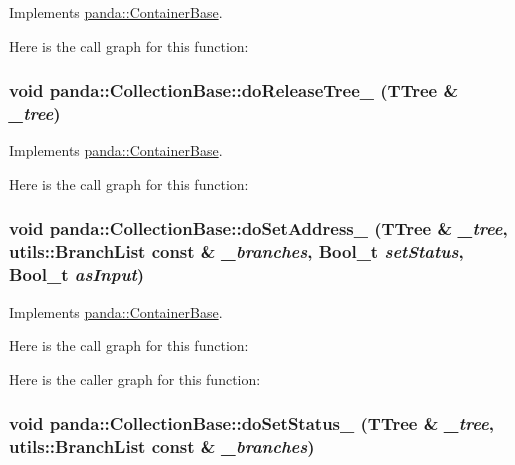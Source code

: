 Implements \hyperlink{classpanda_1_1ContainerBase_a6aa05603a5aff914a56681ab70b01b4e}{panda::ContainerBase}.

Here is the call graph for this function:\hypertarget{classpanda_1_1CollectionBase_ac9d4543501718f3fa96366e43fde46bc}{
\subsubsection[{doReleaseTree\_\-}]{\setlength{\rightskip}{0pt plus 5cm}void panda::CollectionBase::doReleaseTree\_\- (TTree \& {\em \_\-tree})}}
\label{classpanda_1_1CollectionBase_ac9d4543501718f3fa96366e43fde46bc}


Implements \hyperlink{classpanda_1_1ContainerBase_af5628a554142af0fcbbec3f28edd1666}{panda::ContainerBase}.

Here is the call graph for this function:\hypertarget{classpanda_1_1CollectionBase_a2bd8c03841337f83ccdb4279ebf1f24d}{
\subsubsection[{doSetAddress\_\-}]{\setlength{\rightskip}{0pt plus 5cm}void panda::CollectionBase::doSetAddress\_\- (TTree \& {\em \_\-tree}, \/  {\bf utils::BranchList} const \& {\em \_\-branches}, \/  Bool\_\-t {\em setStatus}, \/  Bool\_\-t {\em asInput})}}
\label{classpanda_1_1CollectionBase_a2bd8c03841337f83ccdb4279ebf1f24d}


Implements \hyperlink{classpanda_1_1ContainerBase_a1f8b467981e2d6e55cf1b1e355e4eb93}{panda::ContainerBase}.

Here is the call graph for this function:

Here is the caller graph for this function:\hypertarget{classpanda_1_1CollectionBase_ac615b3ca8e0c3acdab38196bcad23027}{
\subsubsection[{doSetStatus\_\-}]{\setlength{\rightskip}{0pt plus 5cm}void panda::CollectionBase::doSetStatus\_\- (TTree \& {\em \_\-tree}, \/  {\bf utils::BranchList} const \& {\em \_\-branches})}}
\label{classpanda_1_1CollectionBase_ac615b3ca8e0c3acdab38196bcad23027}


